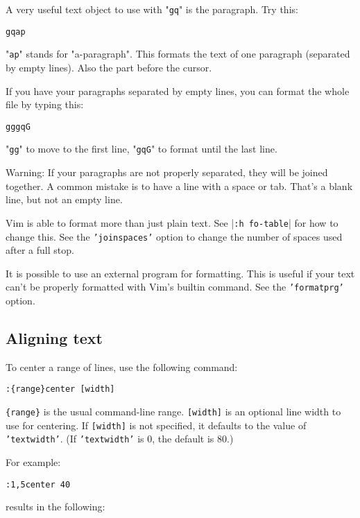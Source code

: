 A very useful text object to use with "\texttt{gq}" is the paragraph.
Try this:

\begin{Verbatim}[samepage=true]
 gqap
\end{Verbatim}

"\texttt{ap}" stands for "a-paragraph".
This formats the text of one paragraph (separated by empty lines).
Also the part before the cursor.

If you have your paragraphs separated by empty lines, you can format the whole file by typing this:

\begin{Verbatim}[samepage=true]
 gggqG
\end{Verbatim}

"\texttt{gg}" to move to the first line, "\texttt{gqG}" to format until the last line.

Warning: If your paragraphs are not properly separated, they will be joined together.
A common mistake is to have a line with a space or tab.
That's a blank line, but not an empty line.

Vim is able to format more than just plain text.
See |\texttt{:h fo-table}| for how to change this.
See the \texttt{'joinspaces'} option to change the number of spaces used after a full stop.

It is possible to use an external program for formatting.
This is useful if your text can't be properly formatted with Vim's builtin command.
See the \texttt{'formatprg'} option.
\subsection{Aligning text}
To center a range of lines, use the following command:

\begin{Verbatim}[samepage=true]
 :{range}center [width]
\end{Verbatim}

\texttt{\{range\}} is the usual command-line range.
\texttt{[width]} is an optional line width to use for centering.
If \texttt{[width]} is not specified, it defaults to the value of \texttt{'textwidth'}.
(If \texttt{'textwidth'} is 0, the default is 80.)

For example:

\begin{Verbatim}[samepage=true]
 :1,5center 40
\end{Verbatim}

results in the following:

